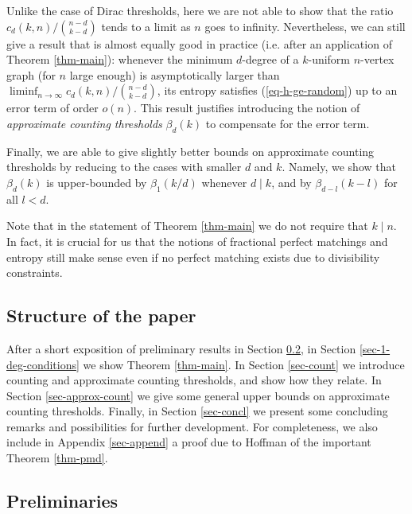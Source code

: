 \documentclass[11pt]{article}
\begin{document}
Unlike the case of Dirac thresholds, here we are not able to show that the ratio $c_d(k,n)/\binom{n-d}{k-d}$ tends to a limit as $n$ goes to infinity. Nevertheless, we can still give a result that is almost equally good in practice (i.e. after an application of Theorem \ref{thm-main}): whenever the minimum $d$-degree of a $k$-uniform $n$-vertex graph (for $n$ large enough) is asymptotically larger than $\liminf_{n\to\infty}c_d(k,n)/\binom{n-d}{k-d}$, its entropy satisfies (\ref{eq-h-ge-random}) up to an error term of order $o(n)$. This result justifies introducing the notion of \emph{approximate counting thresholds} $\beta_d(k)$ to compensate for the error term.

Finally, we are able to give slightly better bounds on approximate counting thresholds by reducing to the cases with smaller $d$ and $k$. Namely, we show that $\beta_d(k)$ is upper-bounded by $\beta_1(k/d)$ whenever $d\mid k$, and by $\beta_{d-l}(k-l)$ for all $l<d$.

Note that in the statement of Theorem \ref{thm-main} we do not require that $k\mid n$. In fact, it is crucial for us that the notions of fractional perfect matchings and entropy still make sense even if no perfect matching exists due to divisibility constraints.


\subsection{Structure of the paper}\label{sec-struct}

After a short exposition of preliminary results in Section \ref{sec-preliminaries}, in Section \ref{sec-1-deg-conditions} we show Theorem \ref{thm-main}. In Section \ref{sec-count} we introduce counting and approximate counting thresholds, and show how they relate. In Section \ref{sec-approx-count} we give some general upper bounds on approximate counting thresholds. Finally, in Section \ref{sec-concl} we present some concluding remarks and possibilities for further development. For completeness, we also include in Appendix \ref{sec-append} a proof due to Hoffman of the important Theorem \ref{thm-pmd}.


\subsection{Preliminaries}\label{sec-preliminaries}


\end{document}
